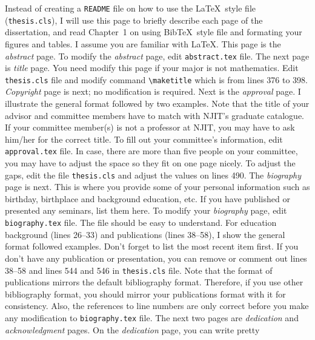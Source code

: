 \noindent


\noindent
Instead of creating a \verb#README# file on how to use the \LaTeX\ style file
(\verb#thesis.cls#), I will use this page to briefly describe each page
of the dissertation, and read Chapter~1 on using Bib\TeX\ style file and formating your figures and tables. I assume you are familiar with \LaTeX.  This page is the
{\em abstract} page.  To modify the {\em abstract} page, edit
\verb#abstract.tex# file.  The next page is {\em title}  page. You need modify this page if your major is not mathematics. Edit \verb#thesis.cls# file and modify command \verb#\maketitle# which is from lines 376 to 398. {\em
Copyright} page is next; no modification is required.  Next is the {\em approval} page.  I illustrate the
general format followed by two examples.  Note that the title of your
advisor and committee members have to match with NJIT's graduate catalogue.
If your committee member(s) is not a professor at NJIT, you may have to ask
him/her for the correct title.  To fill out your committee's information,
edit \verb#approval.tex# file.  In case, there are more than five people on
your committee, you may have to adjust the space so they fit on one page
nicely.  To adjust the gaps, edit the file \verb#thesis.cls# and adjust the values
on lines 490.  The {\em biography} page is next. This is where you
provide some of your personal information such as birthday, birthplace and
background education, etc.  If you have published or presented any
seminars, list them here. To modify your {\em biography} page, edit
\verb#biography.tex# file.  The file should be easy to understand.  For
education background (lines 26--33) and publications (lines 38--58), I
show the general format followed examples. Don't forget to list the
most recent item first. If you don't have any publication or presentation,
you can remove or comment out lines 38--58 and lines 544 and 546 in \verb#thesis.cls# file. Note that the format of publications mirrors the default bibliography format. Therefore, if you use other bibliography format, you should mirror your publications format with it for consistency. Also, the references to line
numbers are only correct before you make any modification to
\verb#biography.tex# file.  The next two pages are {\em dedication} and {\em
acknowledgment} pages.  On the {\em dedication} page, you can write pretty
